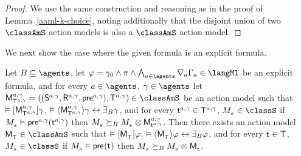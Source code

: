 \begin{proof}[Proof]
We use the same construction and reasoning as in the proof of Lemma~\ref{aaml-k-choice}, noting additionally that the disjoint union of two $\classAmS$ action models is also a $\classAmS$ action model.
\end{proof}

We next show the case where the given formula is an explicit formula.

\begin{lemma}\label{aaml-s5-covers}
Let $\agentsB \subseteq \agents$, 
let $\phi = \gamma_0 \land \pi \land \bigwedge_{\agentA \in \agents} \coverA \Gamma_\agentA \in \langMl$ be an explicit formula, and 
for every $\agentA \in \agents$, $\gamma \in \agents$
let $\aPModelAndTuple[\agentA, \gamma]{\aStatesT[\agentA, \gamma]} \in \classAmS$ be an action model such that 
$\entails \actionA{\aPModel[\agentA, \gamma]{\aStatesT[\agentA, \gamma]}} \gamma$,
$\entails \actionE{\aPModel[\agentA, \gamma]{\aStatesT[\agentA, \gamma]}} \gamma \iff \someactsBs \gamma$, and
for every $\aStateT[\agentA, \gamma] \in \aStatesT[\agentA, \gamma]$, $\kPModel{\kStateS} \in \classS$ if $\kPModel{\kStateS} \entails \aPrecondition[\agentA, \gamma](\aStateT[\agentA, \gamma])$ then $\kPModel{\kStateS} \simulatesBs \kPModel{\kStateS} \exec \aPModel[\agentA, \gamma]{\aStateT[\agentA, \gamma]}$.
Then there exists an action model $\aPModel{\aStatesT} \in \classAmS$ such that 
$\entails \actionA{\aPModel{\aStatesT}} \phi$,
$\entails \actionE{\aPModel{\aStatesT}} \phi \iff \someactsBs \phi$, and 
for every $\aStateT \in \aStatesT$, $\kPModel{\kStateS} \in \classS$ if $\kPModel{\kStateS} \entails \aPrecondition(\aStateT)$ then $\kPModel{\kStateS} \simulatesBs \kPModel{\kStateS} \exec \aPModel{\aStateT}$.
\end{lemma}

